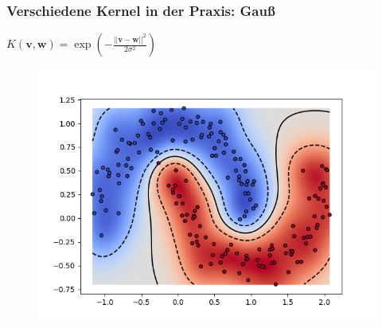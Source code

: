 	\begin{frame}
		\frametitle{Verschiedene Kernel in der Praxis: Gauß}
			\vspace{10pt}
			$K(\boldsymbol{v}, \boldsymbol{w}) = \exp\left(-\frac{\lvert\lvert\boldsymbol{v} - \boldsymbol{w}\rvert\rvert^{2}}{2\sigma^{2}}\right)$ \\
			
			\begin{figure}
				\includegraphics[width=.9\textwidth]{img/kernelGau.png}
			\end{figure}
	\end{frame}
	
